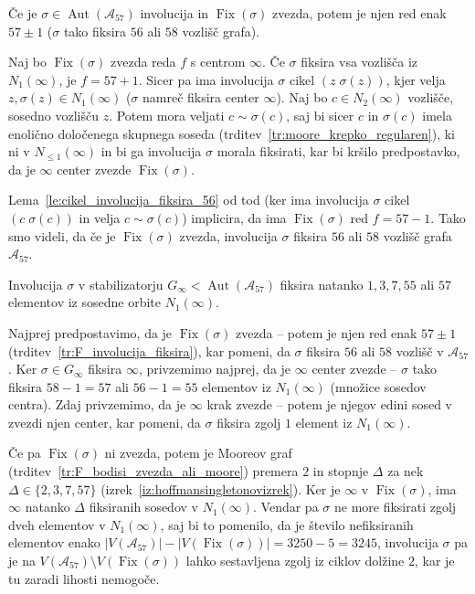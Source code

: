 \documentclass[fin1, tisk]{fmfdelo}
\newcommand{\asch}{\mathscr{A}_{57}}
\newcommand{\fix}{\operatorname{Fix}}
\newcommand{\aut}{\operatorname{Aut}}
\begin{document}
\begin{trditev}\label{tr:F_involucija_fiksira}
    Če je $\sigma\in\aut(\asch)$ involucija in $\fix(\sigma)$ zvezda, potem je njen red enak $57 \pm 1$ 
    ($\sigma$ tako fiksira $56$ ali $58$ vozlišč grafa).
\end{trditev}


\begin{dokaz}%
    Naj bo $\fix(\sigma)$ zvezda reda $f$ s centrom $\infty$.
    Če $\sigma$ fiksira vsa vozlišča iz $N_1(\infty)$, je $f=57+1$.
    Sicer pa ima involucija $\sigma$ cikel $(z\; \sigma(z))$, kjer velja $z, \sigma(z) \in N_1(\infty)$ 
    ($\sigma$ namreč fiksira center $\infty$).
    Naj bo $c\in N_2(\infty)$ vozlišče, sosedno vozlišču $z$. 
    Potem mora veljati $c\sim\sigma(c)$, saj bi sicer $c$ in $\sigma(c)$ 
    imela enolično določenega skupnega soseda (trditev~\ref{tr:moore_krepko_regularen}), 
    ki ni v $N_{\leq 1}(\infty)$ in bi ga involucija $\sigma$ morala fiksirati,
    kar bi kršilo predpostavko, da je $\infty$ center zvezde $\fix(\sigma)$.

    Lema~\ref{le:cikel_involucija_fiksira_56} od tod (ker ima involucija $\sigma$ cikel $(c  \;\sigma(c))$ in velja $c\sim \sigma(c)$)
    implicira, da ima $\fix(\sigma)$ red $f = 57 - 1$.
    Tako smo videli, da če je $\fix(\sigma)$ zvezda, involucija $\sigma$ fiksira $56$ ali $58$ vozlišč grafa $\asch$.
\end{dokaz}

\begin{trditev}\label{tr:involucija_fiksira_cel}
    Involucija $\sigma$ v stabilizatorju $G_{\infty}<\aut(\asch)$ fiksira natanko $1, 3, 7, 55$ ali $57$ 
    elementov iz sosedne orbite $N_1(\infty)$.
\end{trditev}

\begin{dokaz}
    Najprej predpostavimo, da je $\fix(\sigma)$ zvezda -- potem je njen red enak $57 \pm 1$ (trditev~\ref{tr:F_involucija_fiksira}), kar pomeni, da 
    $\sigma$ fiksira $56$ ali $58$ vozlišč v $\asch$. Ker $\sigma \in G_{\infty}$ fiksira $\infty$, 
    privzemimo najprej, da je $\infty$ center zvezde --
    $\sigma$ tako fiksira $58-1=57$ ali $56-1=55$ elementov iz $N_1(\infty)$ (množice sosedov centra).
    Zdaj privzemimo, da je $\infty$ krak zvezde -- potem je njegov edini sosed v zvezdi njen center, kar pomeni,
    da $\sigma$ fiksira zgolj $1$ element iz $N_1(\infty)$.

    Če pa $\fix(\sigma)$ ni zvezda, potem je Mooreov graf (trditev~\ref{tr:F_bodisi_zvezda_ali_moore}) premera $2$ in stopnje $\Delta$ 
    za nek $\Delta\in \{2, 3, 7, 57\}$ (izrek~\ref{iz:hoffmansingletonovizrek}).
    Ker je $\infty$ v $\fix(\sigma)$, ima $\infty$ natanko $\Delta$ fiksiranih sosedov v $N_1(\infty)$. 
    Vendar pa $\sigma$ ne more fiksirati zgolj dveh elementov v $N_1(\infty)$, 
    saj bi to pomenilo, da je število nefiksiranih
    elementov enako
    $|V(\asch)| - |V(\fix(\sigma))| = 3250 - 5 = 3245$, involucija $\sigma$ pa je na $V(\asch) \setminus V(\fix(\sigma))$ lahko sestavljena
    zgolj iz ciklov dolžine $2$, kar je tu zaradi lihosti nemogoče.
\end{dokaz}
\end{document}
